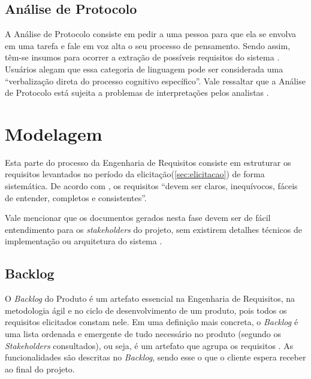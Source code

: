 \subsection{Análise de Protocolo}

\label{sec:analise-protocolo}

A Análise de Protocolo consiste em pedir a uma pessoa para que ela se envolva em uma tarefa e fale em voz alta o seu processo de pensamento. Sendo assim, têm-se insumos para ocorrer a extração de possíveis requisitos do sistema \cite{goguen1993techniques}. Usuários alegam que essa categoria de linguagem pode ser considerada uma “verbalização direta do processo cognitivo específico”. Vale ressaltar que a Análise de Protocolo está sujeita a problemas de interpretações pelos analistas \cite{belgamo2000estudo}.

\section {Modelagem}

\label{sec:modelagem}

Esta parte do processo da Engenharia de Requisitos consiste em estruturar os requisitos levantados no período da elicitação(\ref{sec:elicitacao}) de forma sistemática. De acordo com \cite{Sommerville10}, os requisitos “devem ser claros, inequívocos, fáceis de entender, completos e consistentes”.

Vale mencionar que os documentos gerados nesta fase devem ser de fácil entendimento para os \textit{stakeholders} do projeto, sem existirem detalhes técnicos de implementação ou arquitetura do sistema \cite{Sommerville10}.

\subsection{Backlog}

\label{sec:backlog}

O \textit{Backlog} do Produto é um artefato essencial na Engenharia de Requisitos, na metodologia ágil e no ciclo de desenvolvimento de um produto, pois todos os requisitos elicitados constam nele. Em uma definição mais concreta, o \textit{Backlog} é uma lista ordenada e emergente de tudo necessário no produto (segundo os \textit{Stakeholders} consultados), ou seja, é um artefato que agrupa os requisitos \cite{carolipaulo2021}. As funcionalidades são descritas no \textit{Backlog}, sendo esse o que o cliente espera receber ao final do projeto.

